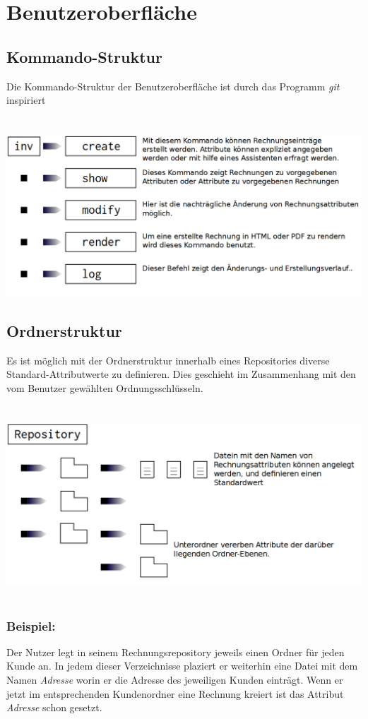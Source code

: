 
\section{Benutzeroberfläche}

\subsection{Kommando-Struktur}
Die Kommando-Struktur der Benutzeroberfläche ist durch das Programm \emph{git} inspiriert\\
\\\\
\includegraphics[width=\textwidth]{kommando-struktur.png}
\\
\subsection{Ordnerstruktur}
Es ist möglich mit der Ordnerstruktur innerhalb eines Repositories diverse
Standard-Attributwerte zu definieren. Dies geschieht im Zusammenhang mit den vom
Benutzer gewählten Ordnungsschlüsseln.\\
\\\\
\includegraphics[width=\textwidth]{ordnerstruktur-struktur.png}
\\\\
\subsubsection*{Beispiel:}
Der Nutzer legt in seinem Rechnungsrepository jeweils einen Ordner für jeden Kunde
an. In jedem dieser Verzeichnisse plaziert er weiterhin eine Datei mit dem Namen
\emph{Adresse} worin er die Adresse des jeweiligen Kunden einträgt. Wenn er jetzt
im entsprechenden Kundenordner eine Rechnung kreiert ist das Attribut \emph{Adresse}
schon gesetzt.
